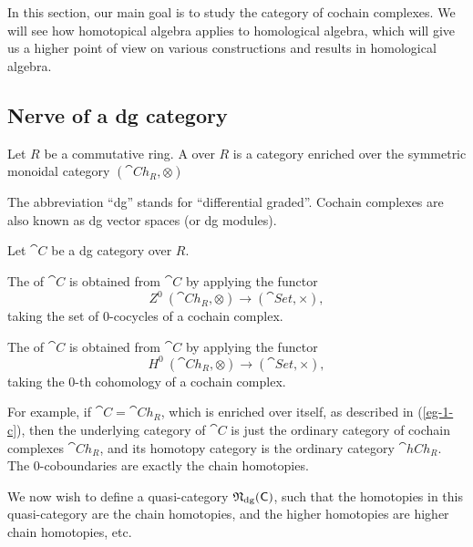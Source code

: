 In this section, our main goal is to study the category of cochain complexes.
We will see how homotopical algebra applies to homological algebra,
which will give us a higher point of view on various
constructions and results in homological algebra.

\subsection{Nerve of a dg category}

\begin{definition}
    Let $R$ be a commutative ring.
    A  over $R$ is a category enriched over the
    symmetric monoidal category $(\cat{Ch}_R,\otimes)$
\end{definition}

The abbreviation ``dg'' stands for ``differential graded''.
Cochain complexes are also known as dg vector spaces (or dg modules).

\begin{definition}
    Let $\cat{C}$ be a dg category over $R$.
    \begin{itms}
        \item The  of $\cat{C}$
        is obtained from $\cat{C}$ by applying the functor 
        \[Z^0\:(\cat{Ch}_R,\otimes)\to(\cat{Set},\times),\]
        taking the set of $0$-cocycles of a cochain complex.
        \item The  of $\cat{C}$
        is obtained from $\cat{C}$ by applying the functor 
        \[H^0\:(\cat{Ch}_R,\otimes)\to(\cat{Set},\times),\]
        taking the $0$-th cohomology of a cochain complex.
    \end{itms}
\end{definition}

For example, if $\cat{C}=\cat{Ch}_R$,
which is enriched over itself, as described in (\ref{eg-1-c}),
then the underlying category of $\cat{C}$ is just the ordinary
category of cochain complexes $\cat{Ch}_R$,
and its homotopy category is the ordinary category $\cat{hCh}_R$.
The $0$-coboundaries are exactly the chain homotopies.

We now wish to define a quasi-category $\mathfrak{N}_{\mathrm{dg}}(\mathsf{C})$,
such that the homotopies in this quasi-category are the chain homotopies,
and the higher homotopies are higher chain homotopies, etc.

